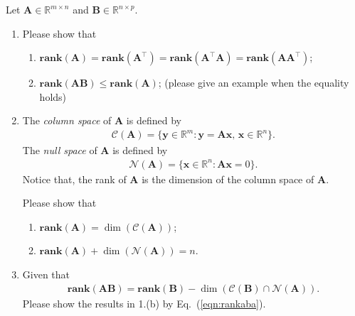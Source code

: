 \documentclass[11pt,letter,notitlepage]{article}
\renewcommand{\eqref}[1]{Eq.~(\ref{#1})}
\newcommand{\rank}[1]{ \textbf{rank}  (#1)  }
\theoremstyle{definition}
\begin{document}
	\newpage
	\begin{exercise}
		Let $\mathbf{A} \in \mathbb{R}^{m\times n}$ and $\mathbf{B}\in \mathbb{R}^{n\times p}$.
		\begin{enumerate}
			\item Please show that
			\begin{enumerate}
				\item $\rank{\mathbf{A}} = \rank{\mathbf{A}^{\top}} = \rank{\mathbf{A}^{\top}\mathbf{A}}= \rank{\mathbf{A}\mathbf{A}^{\top}}$;
				\item $\rank{\mathbf{A}\mathbf{B}} \leq \rank{\mathbf{A}}$; (please give an example when the equality holds)
			\end{enumerate}
			\item The \emph{column space} of $\mathbf{A}$ is defined by
			\begin{align*}
				\mathcal{C}(\mathbf{A} ) = \{ \mathbf{y}\in \mathbb{R}^m : \mathbf{y} = \mathbf{Ax},\,\mathbf{x}\in\mathbb{R}^n\}.
			\end{align*}
			The \emph{null space} of $\mathbf{A}$ is defined by
			\begin{align*}
				\mathcal{N}(\mathbf{A})  = \{ \mathbf{x}\in \mathbb{R}^n : \mathbf{Ax}=0\}.
			\end{align*}
			Notice that, the rank of $\mathbf{A}$ is the dimension of the column space of $\mathbf{A}$.
			
			Please show that
			\begin{enumerate}
				\item $\rank{\mathbf{A}} = \dim(\mathcal{C}(\mathbf{A}))$;
				\item $\rank{\mathbf{A}} + \dim ( \mathcal{N}( \mathbf{A} ) ) = n$.
			\end{enumerate}
			\item Given that
			\begin{align}\label{eqn:rankaba}
				\rank{\mathbf{AB}}=\rank{\mathbf{B}}-\dim(\mathcal{C}(\mathbf{B})\cap \mathcal{N}(\mathbf{A})).
			\end{align}
			Please show the results in 1.(b) by \eqref{eqn:rankaba}.
		\end{enumerate}
	\end{exercise}

\newpage
\end{document}
